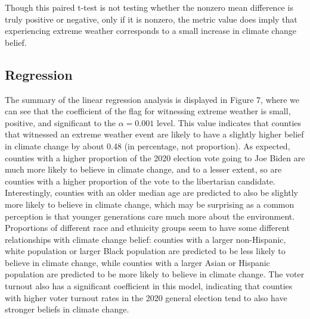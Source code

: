\documentclass{article}
\begin{document}
Though this paired t-test is not testing whether the nonzero mean difference is truly positive or negative, only if it is nonzero, the metric value does imply that experiencing extreme weather corresponds to a small increase in climate change belief.

\subsection{Regression}
The summary of the linear regression analysis is displayed in Figure 7, where we can see that the coefficient of the flag for witnessing extreme weather is small, positive, and significant to the $\alpha = 0.001$ level. This value indicates that counties that witnessed an extreme weather event are likely to have a slightly higher belief in climate change by about 0.48 (in percentage, not proportion). As expected, counties with a higher proportion of the 2020 election vote going to Joe Biden are much more likely to believe in climate change, and to a lesser extent, so are counties with a higher proportion of the vote to the libertarian candidate. Interestingly, counties with an older median age are predicted to also be slightly more likely to believe in climate change, which may be surprising as a common perception is that younger generations care much more about the environment. Proportions of different race and ethnicity groups seem to have some different relationships with climate change belief: counties with a larger non-Hispanic, white population or larger Black population are predicted to be less likely to believe in climate change, while counties with a larger Asian or Hispanic population are predicted to be more likely to believe in climate change. The voter turnout also has a significant coefficient in this model, indicating that counties with higher voter turnout rates in the 2020 general election tend to also have stronger beliefs in climate change.
\end{document}
